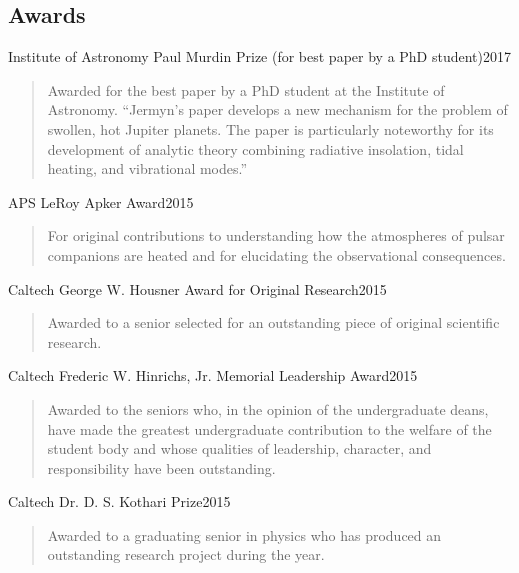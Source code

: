 \documentclass[line, margin]{res3address}
\begin{document}
\begin{resume}
\section{Awards}
Institute of Astronomy Paul Murdin Prize (for best paper by a PhD student)\hfill 2017\\
\vspace{-1em}
\begin{quote}
Awarded for the best paper by a PhD student at the Institute of Astronomy. ``Jermyn’s paper develops a new mechanism for the problem of swollen, hot Jupiter planets. The paper is particularly noteworthy for its development of analytic theory combining radiative insolation, tidal heating, and vibrational modes.''
\end{quote}
\vspace{-1em}
APS LeRoy Apker Award\hfill 2015\\
\vspace{-1em}
\begin{quote}
For original contributions to understanding how the atmospheres of pulsar companions are heated and for elucidating the observational consequences.
\end{quote}
\vspace{-1em}
Caltech George W. Housner Award for Original Research\hfill 2015\\
\vspace{-1em}
\begin{quote}
Awarded to a senior selected for an outstanding piece of original scientific research.
\end{quote}
\vspace{-1em}
Caltech Frederic W. Hinrichs, Jr. Memorial Leadership Award\hfill 2015\\
\vspace{-1em}
\begin{quote}
Awarded to the seniors who, in the opinion of the undergraduate deans, have made the greatest undergraduate contribution to the welfare of the student body and whose qualities of leadership, character, and responsibility have been outstanding.	
\end{quote}
\vspace{-1em}
Caltech Dr. D. S. Kothari Prize\hfill 2015\\
\vspace{-1em}
\begin{quote}
Awarded to a graduating senior in physics who has produced an outstanding research project during the year.
\end{quote}

\end{resume}
\end{document}
